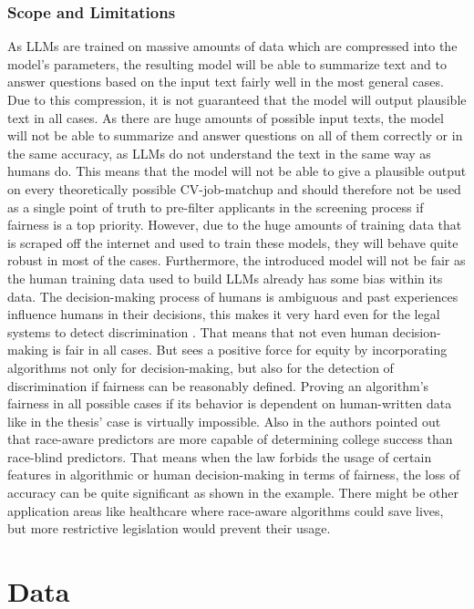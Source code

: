 \documentclass[draft,final]{thesisclass} %
\begin{document}
\subsection{Scope and Limitations}
As \acs{LLM}s are trained on massive amounts of data which are compressed into the model's parameters, the resulting model will be able to summarize text and to answer questions based on the input text fairly well in the most general cases.
Due to this compression, it is not guaranteed that the model will output plausible text in all cases. 
As there are huge amounts of possible input texts, the model will not be able to summarize and answer questions on all of them correctly or in the same accuracy, as \acs{LLM}s do not understand the text in the same way as humans do.
This means that the model will not be able to give a plausible output on every theoretically possible \acs{CV}-job-matchup and should therefore not be used as a single point of truth to pre-filter applicants in the screening process if fairness is a top priority.
However, due to the huge amounts of training data that is scraped off the internet and used to train these models, they will behave quite robust in most of the cases.
Furthermore, the introduced model will not be fair as the human training data used to build \acs{LLM}s already has some bias within its data. The decision-making process of humans is ambiguous and past experiences influence humans in their decisions, this makes it very hard even for the legal systems to detect discrimination \parencite[113]{discrimination_algorithms}. That means that not even human decision-making is fair in all cases. But \textcite[113]{discrimination_algorithms} sees a positive force for equity by incorporating algorithms not only for decision-making, but also for the detection of discrimination if fairness can be reasonably defined. Proving an algorithm's fairness in all possible cases if its behavior is dependent on human-written data like in the thesis' case is virtually impossible. Also in \textcite[158-160]{discrimination_algorithms} the authors pointed out that race-aware predictors are more capable of determining college success than race-blind predictors.
That means when the law forbids the usage of certain features in algorithmic or human decision-making in terms of fairness, the loss of accuracy can be quite significant as shown in the example. There might be other application areas like healthcare where race-aware algorithms could save lives, but more restrictive legislation would prevent their usage.

\chapter{Data}
\end{document}
